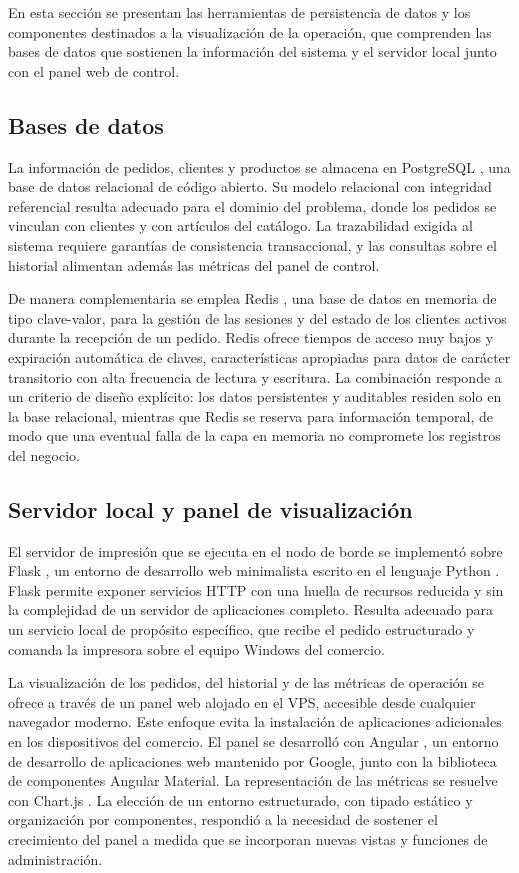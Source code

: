 En esta sección se presentan las herramientas de persistencia de datos y los componentes destinados a la visualización de la operación, que comprenden las bases de datos que sostienen la información del sistema y el servidor local junto con el panel web de control.

\subsection{Bases de datos}
\label{subsec:bases_datos}

La información de pedidos, clientes y productos se almacena en PostgreSQL \cite{postgresql}, una base de datos relacional de código abierto. Su modelo relacional con integridad referencial resulta adecuado para el dominio del problema, donde los pedidos se vinculan con clientes y con artículos del catálogo. La trazabilidad exigida al sistema requiere garantías de consistencia transaccional, y las consultas sobre el historial alimentan además las métricas del panel de control.

De manera complementaria se emplea Redis \cite{redis}, una base de datos en memoria de tipo clave-valor, para la gestión de las sesiones y del estado de los clientes activos durante la recepción de un pedido. Redis ofrece tiempos de acceso muy bajos y expiración automática de claves, características apropiadas para datos de carácter transitorio con alta frecuencia de lectura y escritura. La combinación responde a un criterio de diseño explícito: los datos persistentes y auditables residen solo en la base relacional, mientras que Redis se reserva para información temporal, de modo que una eventual falla de la capa en memoria no compromete los registros del negocio.

\subsection{Servidor local y panel de visualización}
\label{subsec:flask_panel}

El servidor de impresión que se ejecuta en el nodo de borde se implementó sobre Flask \cite{flask}, un entorno de desarrollo web minimalista escrito en el lenguaje Python \cite{python}. Flask permite exponer servicios HTTP con una huella de recursos reducida y sin la complejidad de un servidor de aplicaciones completo. Resulta adecuado para un servicio local de propósito específico, que recibe el pedido estructurado y comanda la impresora sobre el equipo Windows del comercio.

La visualización de los pedidos, del historial y de las métricas de operación se ofrece a través de un panel web alojado en el VPS, accesible desde cualquier navegador moderno. Este enfoque evita la instalación de aplicaciones adicionales en los dispositivos del comercio. El panel se desarrolló con Angular \cite{angular}, un entorno de desarrollo de aplicaciones web mantenido por Google, junto con la biblioteca de componentes Angular Material. La representación de las métricas se resuelve con Chart.js \cite{chartjs}. La elección de un entorno estructurado, con tipado estático y organización por componentes, respondió a la necesidad de sostener el crecimiento del panel a medida que se incorporan nuevas vistas y funciones de administración.